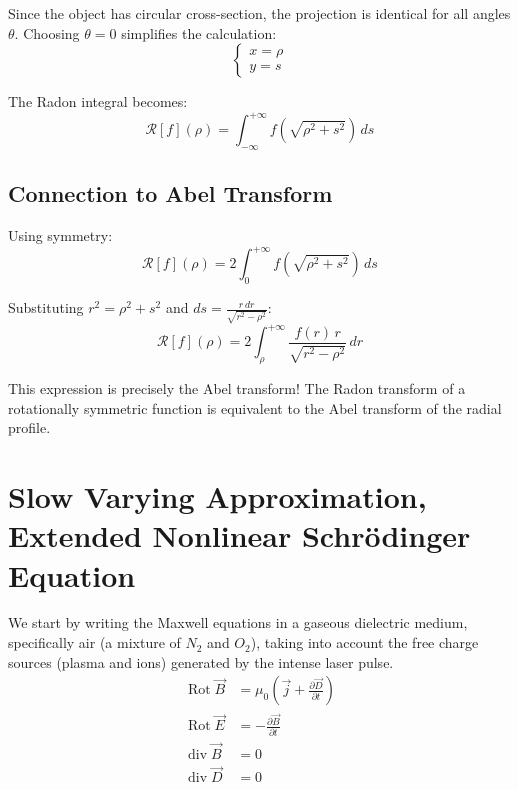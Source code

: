 \documentclass[11pt,a4paper]{article}
\begin{document}
Since the object has circular cross-section, the projection is identical for all angles $\theta$. Choosing $\theta = 0$ simplifies the calculation:
\begin{equation}
\begin{cases}
x = \rho \\
y = s
\end{cases}
\end{equation}

The Radon integral becomes:
\begin{equation}
\mathcal{R}[f](\rho) = \int_{-\infty}^{+\infty} f\left(\sqrt{\rho^2 + s^2}\right) \, ds
\end{equation}

\subsection{Connection to Abel Transform}

Using symmetry:
\begin{equation}
\mathcal{R}[f](\rho) = 2 \int_0^{+\infty} f\left(\sqrt{\rho^2 + s^2}\right) \, ds
\end{equation}

Substituting $r^2 = \rho^2 + s^2$ and $ds = \frac{r \, dr}{\sqrt{r^2 - \rho^2}}$:
\begin{equation}
\mathcal{R}[f](\rho) = 2 \int_{\rho}^{+\infty} \frac{f(r) \, r}{\sqrt{r^2 - \rho^2}} \, dr
\end{equation}

This expression is precisely the Abel transform! The Radon transform of a rotationally symmetric function is equivalent to the Abel transform of the radial profile.
\section{Slow Varying Approximation, Extended Nonlinear Schrödinger Equation}

We start by writing the Maxwell equations in a gaseous dielectric medium, specifically air (a mixture of $N_2$ and $O_2$), taking into account the free charge sources (plasma and ions) generated by the intense laser pulse.
\begin{align}
\operatorname{Rot} \vec{B} &= \mu_0 \left( \vec{j} + \frac{\partial \vec{D}}{\partial t} \right) \\
\operatorname{Rot} \vec{E} &= -\frac{\partial \vec{B}}{\partial t} \\
\operatorname{div} \vec{B} &= 0 \\
\operatorname{div} \vec{D} &= 0
\end{align}
\end{document}
